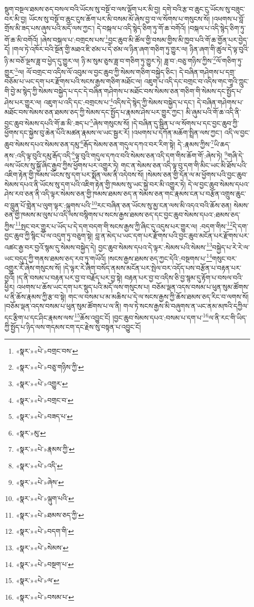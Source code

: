 སྡུག་བསྔལ་ཐམས་ཅད་བསལ་བའི་ཡོངས་སུ་བསྔོ་བ་ལས་ལྡོག་པར་མི་བྱ། དགེ་བའི་རྩ་བ་ཆུང་ངུ་ཡོངས་སུ་བཟུང་བར་མི་བྱ། ཡོངས་སུ་བསྔོ་བ་ཆུང་ངུས་ཆོག་པར་མི་བསམ་མོ་ཞེས་བྱ་བ་ལ་སོགས་པ་གསུངས་སོ། །འཕགས་པ་བློ་གྲོས་མི་ཟད་པས་ཞུས་པའི་མདོ་ལས་ཀྱང་། དེ་བསྐལ་པ་འདི་སྙེད་ཅིག་ཏུ་གོ་ཆ་བགོའོ། །བསྐལ་པ་འདི་སྙེད་ཅིག་ཏུ་གོ་ཆ་མི་བགོའོ། །ཞེས་བསྐལ་པ་:བགྲངས་པས་\footnote{«སྣར་»«པེ་»བགྲང་བས་}བྱང་ཆུབ་མི་ཚོལ་གྱི་བསམ་གྱིས་མི་ཁྱབ་པའི་གོ་ཆ་གྱོན་པར་བྱེད་དོ། །གལ་ཏེ་འཁོར་བའི་སྔོན་གྱི་མཐའ་ཇི་ཙམ་པ་དེ་ཙམ་ལ་ཉིན་ཞག་གཅིག་ཏུ་གྱུར་ལ། ཉིན་ཞག་གི་ཚུལ་དེ་ལྟ་བུའི་ཉི་མ་བཅོ་ལྔས་ཟླ་བ་ཕྱེད་དུ་གྱུར་ལ། ཉི་མ་སུམ་ཅུས་ཟླ་བ་གཅིག་ཏུ་གྱུར་ཏེ། ཟླ་བ་:བཅུ་གཉིས་ཀྱིས་\footnote{«སྣར་»«པེ་»བཅུ་གཉིས་ཀྱི་}ལོ་གཅིག་ཏུ་གྱུར་\footnote{«སྣར་»«པེ་»འགྱུར་}ལ། ལོ་བགྲང་བ་འདིས་ལོ་འབུམ་ལ་བྱང་ཆུབ་ཀྱི་སེམས་གཅིག་བསྐྱེད་ཅིང་། དེ་བཞིན་གཤེགས་པ་དགྲ་བཅོམ་པ་ཡང་དག་པར་རྫོགས་པའི་སངས་རྒྱས་གཅིག་མཐོང་ལ། འཇུག་པ་འདི་དང་བགྲང་བ་འདིས་གང་གཱའི་ཀླུང་གི་བྱེ་མ་སྙེད་ཀྱི་སེམས་བསྐྱེད་པ་དང་དེ་བཞིན་གཤེགས་པ་མཐོང་བས་སེམས་ཅན་གཅིག་གི་སེམས་དང་སྤྱོད་པ་ཤེས་པར་གྱུར་ལ། འཇུག་པ་འདི་དང་:བགྲངས་པ་\footnote{«སྣར་»«པེ་»བགྲང་བ་}འདིས་དེ་སྙེད་ཀྱི་སེམས་བསྐྱེད་པ་དང་། དེ་བཞིན་གཤེགས་པ་མཐོང་བས་སེམས་ཅན་ཐམས་ཅད་ཀྱི་སེམས་དང་སྤྱོད་པ་རྣམས་ཤེས་པར་གྱུར་ཀྱང་། མི་ཞུམ་པའི་གོ་ཆ་འདི་ནི་བྱང་ཆུབ་སེམས་དཔའི་གོ་ཆ་མི་:ཟད་པ་\footnote{«སྣར་»«པེ་»བཟད་པ་}ཞེས་གསུངས་སོ། །དེ་བཞིན་དུ་སྦྱིན་པ་ལ་སོགས་པ་དང་བྱང་ཆུབ་ཀྱི་ཕྱོགས་དང་སྐྱེས་བུ་ཆེན་པོའི་མཚན་རྣམས་ལ་ཡང་སྦྱར་རོ། །འཕགས་པ་དཀོན་མཆོག་སྤྲིན་ལས་ཀྱང་། འདི་ལ་བྱང་ཆུབ་སེམས་དཔའ་སེམས་ཅན་དམུ་\footnote{«སྣར་»མུ་}རྒོད་སེམས་ཅན་གདུལ་དཀའ་བར་རིག་སྟེ། དེ་:རྣམས་ཀྱིས་\footnote{«སྣར་»«པེ་»རྣམས་ཀྱི་}ཡི་ཆད་ནས་:འདི་ལྟ་བུའི་དམུ་རྒོད་འདི་\footnote{«སྣར་»«པེ་»འདི་}ལྟ་བུའི་གདུལ་དཀའ་བའི་སེམས་ཅན་འདི་དག་གིས་ཆོག་གོ་:ཞེས་ཏེ། \footnote{«སྣར་»«པེ་»ཞེས་}གཞི་དེ་ལས་ཡོངས་སུ་སྐྱོ་ཞིང་རྒྱབ་ཀྱིས་ཕྱོགས་པར་འགྱུར་ཏེ། གང་ན་སེམས་ཅན་འདི་ལྟ་བུ་དག་གི་མིང་ཡང་མི་ཐོས་པའི་འཇིག་རྟེན་གྱི་ཁམས་ཡོངས་སུ་དག་པར་སྨོན་ལམ་ནི་འདེབས་སོ། །སེམས་ཅན་གྱི་དོན་ལ་མ་ཕྱོགས་པའི་བྱང་ཆུབ་སེམས་དཔའ་ནི་ཡོངས་སུ་དག་པའི་འཇིག་རྟེན་གྱི་ཁམས་སུ་ཡང་སྐྱེ་བར་མི་འགྱུར་ཏེ། དེ་ལ་བྱང་ཆུབ་སེམས་དཔའ་ཤེས་རབ་ཅན་ནི་འདི་ལྟར་སེམས་ཅན་གྱི་ཁམས་ཐམས་ཅད་ན་སེམས་ཅན་གང་རྣམས་ངན་པ་བརྩོན་འགྲུས་ཆུང་བ་བླུན་པོ་གླེན་པ་ལུག་ལྟར་:ལྐུགས་པའི་\footnote{«སྣར་»«པེ་»ལྐུག་པའི་}རང་བཞིན་ཅན་ཡོངས་སུ་མྱ་ངན་ལས་མི་འདའ་བའི་ཆོས་ཅན། སེམས་ཅན་གྱི་ཁམས་མ་ལུས་པ་འདི་ལས་བསྙིགས་པ་སངས་རྒྱས་ཐམས་ཅད་དང་བྱང་ཆུབ་སེམས་དཔའ་:ཐམས་ཅད་ཀྱིས་\footnote{«སྣར་»«པེ་»ཐམས་ཅད་ཀྱི་}སྤང་བར་གྱུར་པ་ཡོད་པ་དེ་དག་བདག་གི་སངས་རྒྱས་ཀྱི་ཞིང་དུ་འདུས་པར་གྱུར་ལ། :བདག་གིས་\footnote{«སྣར་»«པེ་»བདག་གི་}དེ་དག་བྱང་ཆུབ་ཀྱི་སྙིང་པོ་ལ་འདུག་ཏུ་བཅུག་སྟེ། བླ་ན་མེད་པ་ཡང་དག་པར་རྫོགས་པའི་བྱང་ཆུབ་མངོན་པར་རྫོགས་པར་འཚང་རྒྱ་བར་བྱའོ་སྙམ་དུ་སེམས་བསྐྱེད་དེ། བྱང་ཆུབ་སེམས་དཔའ་དེ་ལྟར་:སེམས་པའི་སེམས་\footnote{«སྣར་»«པེ་»སེམས་}བསྐྱེད་པ་རེ་རེ་ལ་ཡང་བདུད་ཀྱི་གནས་ཐམས་ཅད་རབ་ཏུ་གཡོའོ། །སངས་རྒྱས་ཐམས་ཅད་ཀྱང་དེའི་:བསྔགས་པ་\footnote{«སྣར་»«པེ་»བསྔག་པ་}གསུང་བར་འགྱུར་རོ་ཞེས་གསུངས་སོ། །དེ་ལྟར་རེ་ཞིག་བསོད་ནམས་མངོན་པར་སྤེལ་བར་འདོད་པས་བརྩོན་པ་བརྟན་པར་བྱའོ། །ད་ནི་བསམ་པ་བརྟན་པར་བྱ་བ་བརྗོད་པར་བྱ་སྟེ། བརྟན་པར་བྱ་བ་འདིས་ཅི་བྱ་སྙམ་དུ་རྟོག་པ་བསལ་བའི་ཕྱིར། འཕགས་པ་ཆོས་ཡང་དག་པར་སྡུད་པའི་མདོ་ལས་གསུངས་པ། བཅོམ་ལྡན་འདས་བསམ་པ་ཕུན་སུམ་ཚོགས་པ་ནི་ཆོས་རྣམས་ཀྱི་རྩ་བ་སྟེ། གང་ལ་བསམ་པ་མ་མཆིས་པ་དེ་ལ་སངས་རྒྱས་ཀྱི་ཆོས་ཐམས་ཅད་རིང་བ་ལགས་སོ། །བཅོམ་ལྡན་འདས་བསམ་པ་ཕུན་སུམ་ཚོགས་པ་ལ་ནི། གལ་ཏེ་སངས་རྒྱས་མི་བཞུགས་ན་ཡང་ནམ་མཁའི་དཀྱིལ་དང་རྩིག་པ་དང་ཤིང་རྣམས་ལས་\footnote{«སྣར་»«པེ་»ལ་}ཆོས་འབྱུང་ངོ། །བྱང་ཆུབ་སེམས་དཔའ་:བསམ་པ་དག་པ་\footnote{«སྣར་»«པེ་»བསམ་པ་}ལ་ནི་རང་གི་ཡིད་ཀྱི་སྤྱོད་པ་ཉིད་ལས་གདམས་ངག་དང་རྗེས་སུ་བསྟན་པ་འབྱུང་ངོ། 